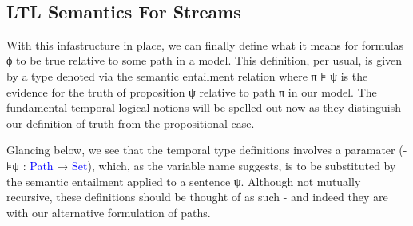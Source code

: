 \documentclass{article}
\newcommand{\blue}[1]{\textcolor{blue}{#1}}
\begin{document}
\begin{code}%
%
\>[2]\AgdaSpace{}%
\AgdaSymbol{:}\AgdaSpace{}%
\AgdaSymbol{(}\AgdaSpace{}%
\AgdaSymbol{:}\AgdaSpace{}%
\AgdaSpace{}%
\AgdaSpace{}%
\AgdaSymbol{)}\AgdaSpace{}%
\AgdaSpace{}%
\<%
\\
%
\>[2]\AgdaSpace{}%
\AgdaSpace{}%
\AgdaSymbol{=}\AgdaSpace{}%
\AgdaSpace{}%
\AgdaSpace{}%
\AgdaSpace{}%
\AgdaSpace{}%
\AgdaSpace{}%
\AgdaSpace{}%
\AgdaSpace{}%
\AgdaSymbol{(}\AgdaSpace{}%
\AgdaSymbol{)}\<%
\\
%
\\[\AgdaEmptyExtraSkip]%
%
\>[2]\AgdaSpace{}%
\AgdaSpace{}%
\AgdaSymbol{:}\AgdaSpace{}%
\AgdaSpace{}%
\<%
\\
\>[2][@{}l@{\AgdaIndent{0}}]%
\>[4]\<%
\\
\>[4][@{}l@{\AgdaIndent{0}}]%
\>[6]%
\>[21]\AgdaSymbol{:}\AgdaSpace{}%
\AgdaSpace{}%
\AgdaSpace{}%
\<%
\\
%
\>[6]\AgdaSpace{}%
\AgdaSymbol{:}\AgdaSpace{}%
\AgdaSpace{}%
\<%
\end{code}
\begin{code}[hide]%
%
\>[2]\AgdaSpace{}%
\<%
\end{code}

\subsection{LTL Semantics For Streams}

With this infastructure in place, we can finally define what it means for
formulas ϕ to be true relative to some path in a model. This definition, per
usual, is given by a type denoted via the semantic entailment relation
where π ⊧ ψ is the evidence for the truth of proposition ψ relative to path π in
our model. The fundamental temporal logical notions will be spelled out now as
they distinguish our definition of truth from the propositional case.

Glancing below, we see that the temporal type definitions involves a paramater
(-⊧ψ : \blue{Path} → \blue{Set}), which, as the variable name suggests, is to be substituted
by the semantic entailment applied to a sentence ψ. Although not mutually
recursive, these definitions should be thought of as such - and indeed they are
with our alternative formulation of paths.
\end{document}
